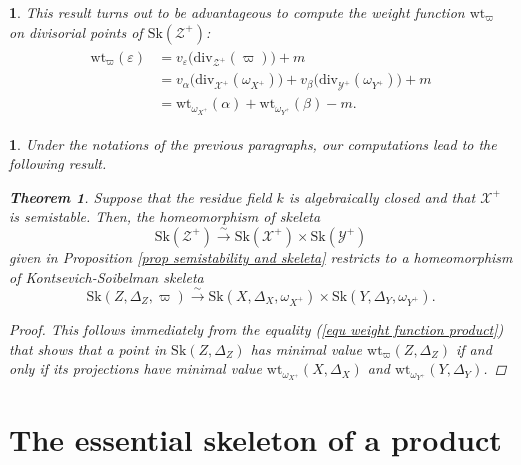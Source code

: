 \documentclass{amsart}%
\numberwithin{equation}{subsection}
\theoremstyle{plain2}
\newtheorem{thm}[equation]{Theorem}
\theoremstyle{definition2}
\theoremstyle{stepstyle}
\theoremstyle{point}
\theoremstyle{subpoint}
\newtheorem{subpoint}[equation]{}%
\newcommand{\spa}[1]{\begin{subpoint}#1\end{subpoint}}           %
\newcommand{\cX}{\ensuremath{\mathscr{X}}}
\newcommand{\cY}{\ensuremath{\mathscr{Y}}}
\newcommand{\cZ}{\ensuremath{\mathscr{Z}}}
\renewcommand{\cZ}{\ensuremath{\mathscr{Z}}}
\renewcommand{\cY}{\ensuremath{\mathscr{Y}}}
\newcommand{\divisor}{\mathrm{div}}
\newcommand{\weight}{\mathrm{wt}}
\newcommand{\Sk}{\mathrm{Sk}}
\begin{document}
\spa{This result turns out to be advantageous to compute the weight function $\weight_\varpi$ on divisorial points of $\Sk(\cZ^+)$: 
\begin{align} \label{equ weight function product}
\begin{split}
\weight_\varpi(\varepsilon)
& = v_{\varepsilon}\big(\divisor_{\cZ^+}(\varpi)\big) +m \\
& = v_{\alpha}\big(\divisor_{\cX^+}(\omega_{X^+})\big) + v_{\beta}\big(\divisor_{\cY^+}(\omega_{Y^+})\big) + m \\
& = \weight_{\omega_{X^+}}(\alpha) + \weight_{\omega_{Y^+}}(\beta) - m.
\end{split}
\end{align}
}


\spa{Under the notations of the previous paragraphs, our computations lead to the following result.
\begin{thm}  \label{thm semistability and KS skeleta}
Suppose that the residue field $k$ is algebraically closed and that $\cX^+$ is semistable. Then, the homeomorphism of skeleta $$\Sk(\cZ^+) \xrightarrow{\sim} \Sk(\cX^+) \times \Sk(\cY^+)$$ given in Proposition \ref{prop semistability and skeleta} restricts to a homeomorphism of Kontsevich-Soibelman skeleta $$\Sk(Z,\Delta_Z, \varpi) \xrightarrow{\sim} \Sk(X,\Delta_X, \omega_{X^+}) \times \Sk(Y,\Delta_Y, \omega_{Y^+}).$$ 
\end{thm}
\begin{proof}
This follows immediately from the equality (\ref{equ weight function product}) that shows that a point in $\Sk(Z,\Delta_Z)$ has minimal value $\weight_{\varpi}(Z,\Delta_Z)$ if and only if its projections have minimal value $\weight_{\omega_{X^+}}(X,\Delta_X)$ and $\weight_{\omega_{Y^+}}(Y,\Delta_Y)$.
\end{proof}
}

\section{The essential skeleton of a product}
\end{document}
